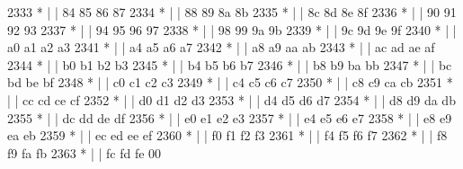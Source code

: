 \begin{DoxyCode}
2333 \textcolor{comment}{         * |    |                           84  85  86  87}
2334 \textcolor{comment}{         * |    |                           88  89  8a  8b}
2335 \textcolor{comment}{         * |    |                           8c  8d  8e  8f}
2336 \textcolor{comment}{         * |    |                           90  91  92  93}
2337 \textcolor{comment}{         * |    |                           94  95  96  97}
2338 \textcolor{comment}{         * |    |                           98  99  9a  9b}
2339 \textcolor{comment}{         * |    |                           9c  9d  9e  9f}
2340 \textcolor{comment}{         * |    |                           a0  a1  a2  a3}
2341 \textcolor{comment}{         * |    |                           a4  a5  a6  a7}
2342 \textcolor{comment}{         * |    |                           a8  a9  aa  ab}
2343 \textcolor{comment}{         * |    |                           ac  ad  ae  af}
2344 \textcolor{comment}{         * |    |                           b0  b1  b2  b3}
2345 \textcolor{comment}{         * |    |                           b4  b5  b6  b7}
2346 \textcolor{comment}{         * |    |                           b8  b9  ba  bb}
2347 \textcolor{comment}{         * |    |                           bc  bd  be  bf}
2348 \textcolor{comment}{         * |    |                           c0  c1  c2  c3}
2349 \textcolor{comment}{         * |    |                           c4  c5  c6  c7}
2350 \textcolor{comment}{         * |    |                           c8  c9  ca  cb}
2351 \textcolor{comment}{         * |    |                           cc  cd  ce  cf}
2352 \textcolor{comment}{         * |    |                           d0  d1  d2  d3}
2353 \textcolor{comment}{         * |    |                           d4  d5  d6  d7}
2354 \textcolor{comment}{         * |    |                           d8  d9  da  db}
2355 \textcolor{comment}{         * |    |                           dc  dd  de  df}
2356 \textcolor{comment}{         * |    |                           e0  e1  e2  e3}
2357 \textcolor{comment}{         * |    |                           e4  e5  e6  e7}
2358 \textcolor{comment}{         * |    |                           e8  e9  ea  eb}
2359 \textcolor{comment}{         * |    |                           ec  ed  ee  ef}
2360 \textcolor{comment}{         * |    |                           f0  f1  f2  f3}
2361 \textcolor{comment}{         * |    |                           f4  f5  f6  f7}
2362 \textcolor{comment}{         * |    |                           f8  f9  fa  fb}
2363 \textcolor{comment}{         * |    |                           fc  fd  fe  00}

\end{DoxyCode}
